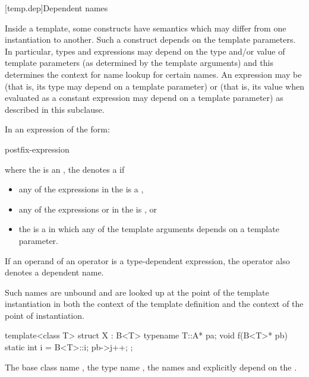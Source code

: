 [temp.dep]{Dependent names}

\pnum
{}%
Inside a template, some constructs have semantics which may differ from one
instantiation to another.
Such a construct
depends
on the template parameters.
In particular, types and expressions may depend on the type
and/or
value of
template parameters (as determined by the template arguments) and this determines
the context for name lookup for certain names.
An expression may be
(that is, its type may depend on a template parameter) or
(that is, its value when evaluated as a constant expression
may depend on a template parameter)
as described in this subclause.

\pnum
In an expression of the form:
\begin{ncsimplebnf}
postfix-expression \terminal{(}  \terminal{)}
\end{ncsimplebnf}
where the
is an
,
the
denotes a
if
\begin{itemize}
\item
any of the expressions in the  is a
,
\item
any of the expressions
or 
in the
is , or
\item
the 
is a  in which any of the template arguments depends
on a template parameter.
\end{itemize}

If an operand of an operator is a type-dependent expression, the operator
also denotes a dependent name.
\begin{note}
Such names are unbound and
are looked up at the point of the template instantiation in
both the context of the template definition and the
context of the point of instantiation.
\end{note}

\pnum
\begin{example}
\begin{codeblock}
template<class T> struct X : B<T> {
  typename T::A* pa;
  void f(B<T>* pb) {
    static int i = B<T>::i;
    pb->j++;
  }
};
\end{codeblock}

The base class name
,
the type name
,
the names
and
explicitly depend on the
.
\end{example}

